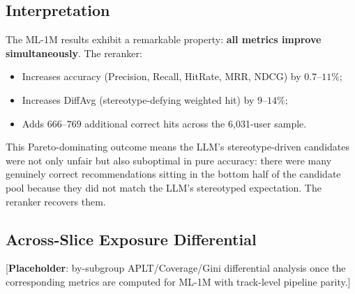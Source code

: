 \subsection{Interpretation}

The ML-1M results exhibit a remarkable property: \textbf{all metrics improve simultaneously}. The reranker:
\begin{itemize}
\item Increases accuracy (Precision, Recall, HitRate, MRR, NDCG) by $0.7$--$11\%$;
\item Increases DiffAvg (stereotype-defying weighted hit) by $9$--$14\%$;
\item Adds $666$--$769$ additional correct hits across the 6,031-user sample.
\end{itemize}

This Pareto-dominating outcome means the LLM's stereotype-driven candidates were not only unfair but also suboptimal in pure accuracy: there were many genuinely correct recommendations sitting in the bottom half of the candidate pool because they did not match the LLM's stereotyped expectation. The reranker recovers them.

\subsection{Across-Slice Exposure Differential}

[\textbf{Placeholder}: by-subgroup APLT/Coverage/Gini differential analysis once the corresponding metrics are computed for ML-1M with track-level pipeline parity.]
